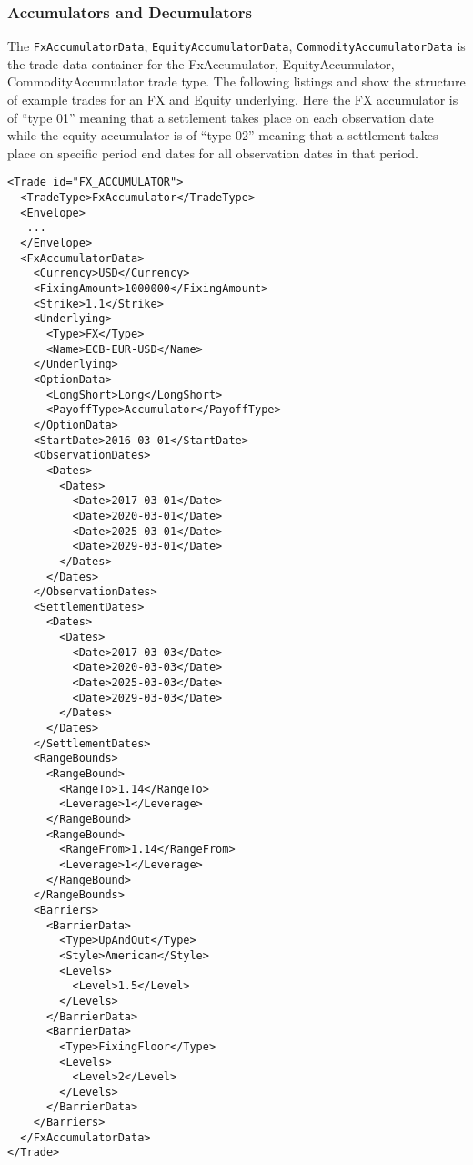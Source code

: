 \subsubsection{Accumulators and Decumulators}

The \verb+FxAccumulatorData+, \verb+EquityAccumulatorData+, \verb+CommodityAccumulatorData+ is the trade data container
for the FxAccumulator, EquityAccumulator, CommodityAccumulator trade type. The following listings and show the
structure of example trades for an FX and Equity underlying. Here the FX accumulator is of ``type 01'' meaning that a
settlement takes place on each observation date while the equity accumulator is of ``type 02'' meaning that a settlement
takes place on specific period end dates for all observation dates in that period.

\begin{verbatim}
<Trade id="FX_ACCUMULATOR">
  <TradeType>FxAccumulator</TradeType>
  <Envelope>
   ...
  </Envelope>
  <FxAccumulatorData>
    <Currency>USD</Currency>
    <FixingAmount>1000000</FixingAmount>
    <Strike>1.1</Strike>
    <Underlying>
      <Type>FX</Type>
      <Name>ECB-EUR-USD</Name>
    </Underlying>
    <OptionData>
      <LongShort>Long</LongShort>
      <PayoffType>Accumulator</PayoffType>
    </OptionData>
    <StartDate>2016-03-01</StartDate>
    <ObservationDates>
      <Dates>
        <Dates>
          <Date>2017-03-01</Date>
          <Date>2020-03-01</Date>
          <Date>2025-03-01</Date>
          <Date>2029-03-01</Date>
        </Dates>
      </Dates>
    </ObservationDates>
    <SettlementDates>
      <Dates>
        <Dates>
          <Date>2017-03-03</Date>
          <Date>2020-03-03</Date>
          <Date>2025-03-03</Date>
          <Date>2029-03-03</Date>
        </Dates>
      </Dates>
    </SettlementDates>
    <RangeBounds>
      <RangeBound>
        <RangeTo>1.14</RangeTo>
        <Leverage>1</Leverage>
      </RangeBound>
      <RangeBound>
        <RangeFrom>1.14</RangeFrom>
        <Leverage>1</Leverage>
      </RangeBound>
    </RangeBounds>
    <Barriers>
      <BarrierData>
        <Type>UpAndOut</Type>
        <Style>American</Style>
        <Levels>
          <Level>1.5</Level>
        </Levels>
      </BarrierData>
      <BarrierData>
        <Type>FixingFloor</Type>
        <Levels>
          <Level>2</Level>
        </Levels>
      </BarrierData>
    </Barriers>
  </FxAccumulatorData>
</Trade>
\end{verbatim}

